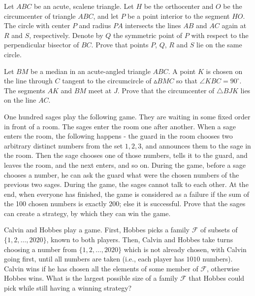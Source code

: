 \documentclass[11pt]{scrartcl}
\begin{document}
\begin{problem}[156471770451237]
	Let $ABC$ be an acute, scalene triangle. Let $H$ be the orthocenter and $O$ be the circumcenter of triangle $ABC$, and let $P$ be a point interior to the segment $HO.$ The circle with center $P$ and radius $PA$ intersects the lines $AB$ and $AC$ again at $R$ and $S$, respectively. Denote by $Q$ the symmetric point of $P$ with respect to the perpendicular bisector of $BC$. Prove that points $P$, $Q$, $R$ and $S$ lie on the same circle.
\end{problem}
\begin{problem}[1891712635906763103]
	Let $BM$ be a median in an acute-angled triangle $ABC$. A point $K$ is chosen on the line through $C$ tangent to the circumcircle of $\vartriangle BMC$ so that $\angle KBC = 90^\circ$. The segments $AK$ and $BM$ meet at $J$. Prove that the circumcenter of $\triangle BJK$ lies on the line $AC$.
\end{problem}
\begin{problem}[2212576839999739806]
	One hundred sages play the following game. They are waiting in some fixed order in front of a room. The sages enter the room one after another. When a sage enters the room, the following happens - the guard in the room chooses two arbitrary distinct numbers from the set {$1,2,3$}, and announces them to the sage in the room. Then the sage chooses one of those numbers, tells it to the guard, and leaves the room, and the next enters, and so on. During the game, before a sage chooses a number, he can ask the guard what were the chosen numbers of the previous two sages. During the game, the sages cannot talk to each other. At the end, when everyone has finished, the game is considered as a failure if the sum of the 100 chosen numbers is exactly $200$; else it is successful. Prove that the sages can create a strategy, by which they can win the game.
\end{problem}
\begin{problem}[8608387455131778331]
  Calvin and Hobbes play a game.
  First, Hobbes picks a family $\mathcal F$ of subsets
  of $\{1, 2, \dots, 2020\}$, known to both players.
  Then, Calvin and Hobbes take turns choosing a number
  from $\{1, 2, \dots, 2020\}$
  which is not already chosen, with Calvin going first,
  until all numbers are taken (i.e., each player has $1010$ numbers).
  Calvin wins if he has chosen all the elements
  of some member of $\mathcal F$, otherwise Hobbes wins.
  What is the largest possible size of a family $\mathcal F$ that Hobbes
  could pick while still having a winning strategy?
\end{problem}
\end{document}
